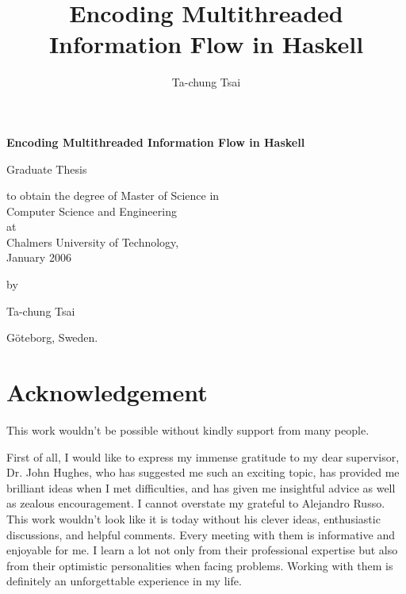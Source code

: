 \documentclass{report}
\title{Encoding Multithreaded Information Flow in Haskell}
\author{Ta-chung Tsai}
\newcommand{\myTitle}{Encoding Multithreaded Information Flow in Haskell}
\newcommand{\mySubtitle}{}
\newcommand{\myAuthor}{Ta-chung Tsai}
\begin{document}
\pagestyle{plain}

\thispagestyle{empty}

\clearpage
\par\vskip 2cm
\begin{center}
{\Huge\bf \myTitle                                         %
\vskip 1cm \Large \mySubtitle                              }           %
\par\vspace {6cm}
{\large Graduate Thesis }
\par\vspace {1cm}
{\large to obtain the degree of Master of Science in \\
Computer Science and Engineering \\
at\\
Chalmers University of Technology, \\
January 2006 \\ }            %
\par\vspace {1cm} {\large by}
\par \vspace {1cm}
{\Large \myAuthor            }                                  %
\par\vspace {1cm}
{\large G\"{o}teborg, Sweden.}                 %
\end{center}

\clearpage



\tableofcontents

\listoffigures
{}

\listoftables
{}

\chapter*{Acknowledgement}

This work wouldn't be possible without kindly support from many people.

First of all, I would like to express my immense gratitude to my dear supervisor, 
Dr. John Hughes, who has suggested me such an exciting topic, has provided me brilliant ideas
when I met difficulties, and has given me insightful advice as well as zealous encouragement.
I cannot overstate my grateful to Alejandro Russo. This work wouldn't look like it is today
without his clever ideas, enthusiastic discussions, and helpful comments.
Every meeting with them is informative and enjoyable for me.  
I learn a lot not only from their professional expertise but also from their optimistic personalities
when facing problems.
Working with them is definitely an unforgettable experience in my life.
\end{document}
